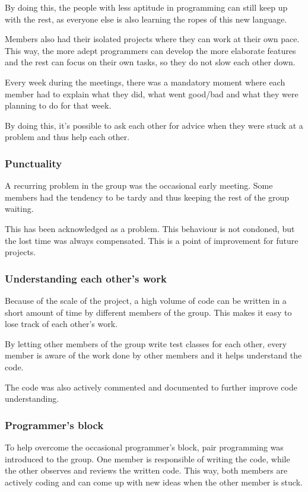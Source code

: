 \documentclass[10pt,a4paper]{report}
\begin{document}
				By doing this, the people with less aptitude in programming can still keep up with the rest, as everyone else is also learning the ropes of this new language.
				
				Members also had their isolated projects where they can work at their own pace. This way, the more adept programmers can develop the more elaborate features and the rest can focus on their own tasks, so they do not slow each other down.
				
				Every week during the meetings, there was a mandatory moment where each member had to explain what they did, what went good/bad and what they were planning to do for that week.
				
				By doing this, it's possible to ask each other for advice when they were stuck at a problem and thus help each other.
			\subsubsection*{Punctuality}
				A recurring problem in the group was the occasional early meeting. Some members had the tendency to be tardy and thus keeping the rest of the group waiting.
				
				This has been acknowledged as a problem. This behaviour is not condoned, but the lost time was always compensated. This is a point of improvement for future projects.
			\subsubsection*{Understanding each other's work}
				Because of the scale of the project, a high volume of code can be written in a short amount of time by different members of the group. This makes it easy to lose track of each other's work. 
				
				By letting other members of the group write test classes for each other, every member is aware of the work done by other members and it helps understand the code. 
				
				The code was also actively commented and documented to further improve code understanding.
			\subsubsection*{Programmer's block}
				To help overcome the occasional programmer's block, pair programming was introduced to the group. One member is responsible of writing the code, while the other observes and reviews the written code. This way, both members are actively coding and can come up with new ideas when the other member is stuck.
\end{document}
